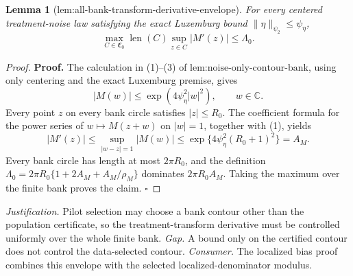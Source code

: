\documentclass{article}
\newtheorem{lemma}{Lemma}
\begin{document}
\begin{lemma}[lem:all-bank-transform-derivative-envelope]\label{lem:all-bank-transform-derivative-envelope}
For every centered treatment-noise law satisfying the exact Luxemburg bound \(\|\eta\|_{\psi_2}\le\psi_\eta\),
\[
 \max_{C\in\mathfrak C_0}\operatorname{len}(C)
 \sup_{z\in C}|M'(z)|\le\Lambda_0.
\]
\end{lemma}
\begin{proof}
\textbf{Proof.}
The calculation in (1)--(3) of \(\text{lem:noise-only-contour-bank}\), using only centering and the exact Luxemburg premise, gives
\[
 |M(w)|\le\exp(4\psi_\eta^2|w|^2),
 \qquad w\in\mathbb C. \tag{1}
\]
Every point \(z\) on every bank circle satisfies \(|z|\le R_0\).  The coefficient formula for the power series of \(w\mapsto M(z+w)\) on \(|w|=1\), together with (1), yields
\[
 |M'(z)|\le
 \sup_{|w-z|=1}|M(w)|
 \le\exp\{4\psi_\eta^2(R_0+1)^2\}=A_M. \tag{2}
\]
Every bank circle has length at most \(2\pi R_0\), and the definition
\(\Lambda_0=2\pi R_0\{1+2A_M+A_M/\rho_M\}\) dominates \(2\pi R_0A_M\).  Taking the maximum over the finite bank proves the claim. \(\square\)
\end{proof}
\par\smallskip\noindent \textit{Justification.} Pilot selection may choose a bank contour other than the population certificate, so the treatment-transform derivative must be controlled uniformly over the whole finite bank. \textit{Gap.} A bound only on the certified contour does not control the data-selected contour. \textit{Consumer.} The localized bias proof combines this envelope with the selected localized-denominator modulus.
\end{document}
